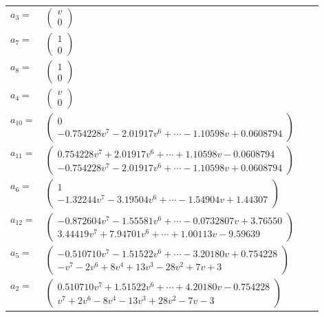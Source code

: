 \documentclass[1p]{elsarticle_modified}
\theoremstyle{definition}
\begin{document}
\begin{tabular}{m{7pt} m{180pt} m{7pt} m{180pt} }
\flushright $a_{3}=$&$\begin{pmatrix}v\\0\end{pmatrix}$ \\
\flushright $a_{7}=$&$\begin{pmatrix}1\\0\end{pmatrix}$ \\
\flushright $a_{8}=$&$\begin{pmatrix}1\\0\end{pmatrix}$ \\
\flushright $a_{4}=$&$\begin{pmatrix}v\\0\end{pmatrix}$ \\
\flushright $a_{10}=$&$\begin{pmatrix}0\\-0.754228 v^{7}-2.01917 v^{6}+\cdots-1.10598 v+0.0608794\end{pmatrix}$ \\
\flushright $a_{11}=$&$\begin{pmatrix}0.754228 v^{7}+2.01917 v^{6}+\cdots+1.10598 v-0.0608794\\-0.754228 v^{7}-2.01917 v^{6}+\cdots-1.10598 v+0.0608794\end{pmatrix}$ \\
\flushright $a_{6}=$&$\begin{pmatrix}1\\-1.32244 v^{7}-3.19504 v^{6}+\cdots-1.54904 v+1.44307\end{pmatrix}$ \\
\flushright $a_{12}=$&$\begin{pmatrix}-0.872604 v^{7}-1.55581 v^{6}+\cdots-0.0732807 v+3.76550\\3.44419 v^{7}+7.94701 v^{6}+\cdots+1.00113 v-9.59639\end{pmatrix}$ \\
\flushright $a_{5}=$&$\begin{pmatrix}-0.510710 v^{7}-1.51522 v^{6}+\cdots-3.20180 v+0.754228\\- v^7-2 v^6+8 v^4+13 v^3-28 v^2+7 v+3\end{pmatrix}$ \\
\flushright $a_{2}=$&$\begin{pmatrix}0.510710 v^{7}+1.51522 v^{6}+\cdots+4.20180 v-0.754228\\v^7+2 v^6-8 v^4-13 v^3+28 v^2-7 v-3\end{pmatrix}$ \\

\end{tabular}
\end{document}
